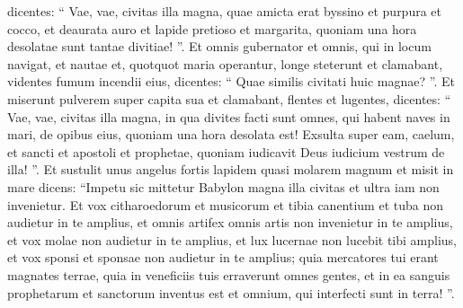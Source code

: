 \begin{biblechapter}
\begin{biblechapter}
\begin{biblechapter}
\begin{biblechapter}
\begin{biblechapter}
\begin{biblechapter}
\begin{biblechapter}
\begin{biblechapter}
\begin{biblechapter}
\begin{biblechapter}
\begin{biblechapter}
\begin{biblechapter}
\begin{biblechapter}
\begin{biblechapter}
\begin{biblechapter}
\begin{biblechapter}
\begin{biblechapter}
\begin{biblechapter}
\verse dicentes: “ Vae, vae, civitas illa magna, quae amicta erat byssino et purpura et cocco, et deaurata auro et lapide pretioso et margarita, 
\verse quoniam una hora desolatae sunt tantae divitiae! ”.
 Et omnis gubernator et omnis, qui in locum navigat, et nautae et, quotquot maria operantur, longe steterunt 
\verse et clamabant, videntes fumum incendii eius, dicentes: “ Quae similis civitati huic magnae? ”. 
\verse Et miserunt pulverem super capita sua et clamabant, flentes et lugentes, dicentes: “ Vae, vae, civitas illa magna, in qua divites facti sunt omnes, qui habent naves in mari, de opibus eius, quoniam una hora desolata est! 
\verse Exsulta super eam, caelum, et sancti et apostoli et prophetae, quoniam iudicavit Deus iudicium vestrum de illa! ”.
 \verse Et sustulit unus angelus fortis lapidem quasi molarem magnum et misit in mare dicens: “Impetu sic mittetur Babylon magna illa civitas et ultra iam non invenietur. 
\verse Et vox citharoedorum et musicorum et tibia canentium et tuba non audietur in te amplius, et omnis artifex omnis artis non invenietur in te amplius, et vox molae non audietur in te amplius, 
\verse et lux lucernae non lucebit tibi amplius, et vox sponsi et sponsae non audietur in te amplius; quia mercatores tui erant magnates terrae, quia in veneficiis tuis erraverunt omnes gentes, 
\verse et in ea sanguis prophetarum et sanctorum inventus est et omnium, qui interfecti sunt in terra! ”.
 

\end{biblechapter}
\end{biblechapter}
\end{biblechapter}
\end{biblechapter}
\end{biblechapter}
\end{biblechapter}
\end{biblechapter}
\end{biblechapter}
\end{biblechapter}
\end{biblechapter}
\end{biblechapter}
\end{biblechapter}
\end{biblechapter}
\end{biblechapter}
\end{biblechapter}
\end{biblechapter}
\end{biblechapter}
\end{biblechapter}
